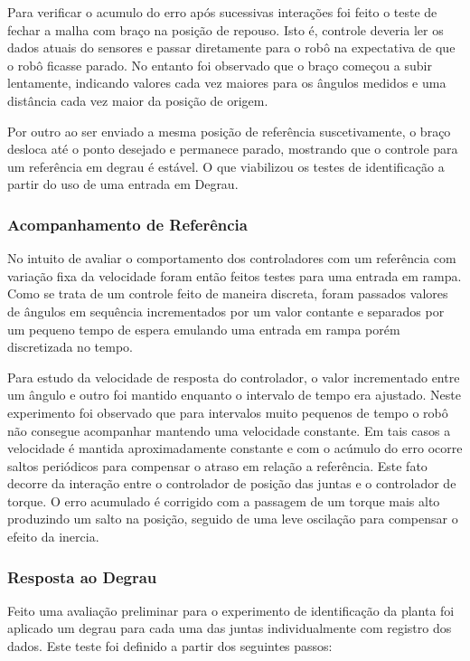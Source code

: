 Para verificar o acumulo do erro após sucessivas interações foi feito o teste de fechar a malha com braço na posição de repouso. Isto é, controle deveria ler os dados atuais do sensores e passar diretamente para o robô na expectativa de que o robô ficasse parado. No entanto foi observado que o braço começou a subir lentamente, indicando valores cada vez maiores para os ângulos medidos e uma distância cada vez maior da posição de origem.

Por outro ao ser enviado a mesma posição de referência suscetivamente, o braço desloca até o ponto desejado e permanece parado, mostrando que o controle para um referência em degrau é estável. O que viabilizou os testes de identificação a partir do uso de uma entrada em Degrau.

\subsubsection{Acompanhamento de Referência}

No intuito de avaliar o comportamento dos controladores com um referência  com variação fixa da velocidade foram então feitos testes para uma entrada em rampa. Como se trata de um controle feito de maneira discreta, foram passados valores de ângulos em sequência incrementados por um valor contante e separados por um pequeno tempo de espera emulando uma entrada em rampa porém discretizada no tempo.

Para estudo da velocidade de resposta do controlador, o valor incrementado entre um ângulo e outro foi mantido enquanto o intervalo de tempo era ajustado. Neste experimento foi observado que para intervalos muito pequenos de tempo o robô não consegue acompanhar mantendo uma velocidade constante. Em tais casos a velocidade é mantida aproximadamente constante e com o acúmulo do erro ocorre saltos periódicos para compensar o atraso em relação a referência. Este fato decorre da interação entre o controlador de posição das juntas e o controlador de torque. O erro acumulado é corrigido com a passagem de um torque mais alto produzindo um salto na posição, seguido de uma leve oscilação para compensar o efeito da inercia.


\subsubsection{Resposta ao Degrau}

Feito uma avaliação preliminar para o experimento de identificação da planta foi aplicado um degrau para cada uma das juntas individualmente com registro dos dados. Este teste foi definido a partir dos seguintes passos:

